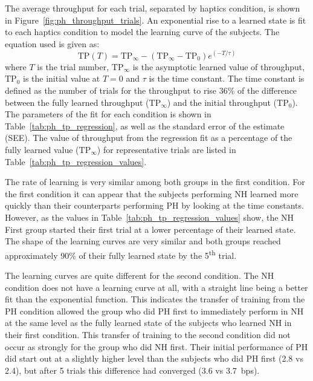 The average throughput for each trial, separated by haptics condition, is shown in Figure~\ref{fig:ph_throughput_trials}.
An exponential rise to a learned state is fit to each haptics condition to model the learning curve of the subjects.
The equation used is given as:
\begin{equation}
    \mathrm{TP}(T) = \mathrm{TP}_{\infty} - (\mathrm{TP}_{\infty}-\mathrm{TP}_0)e^{\left( -T / \tau \right)}
    \label{eq:ph_learning}
\end{equation}
where $T$ is the trial number, $\mathrm{TP}_{\infty}$ is the asymptotic learned value of throughput, $\mathrm{TP}_0$ is the initial value at $T=0$ and $\tau$ is the time constant.
The time constant is defined as the number of trials for the throughput to rise 36\% of the difference between the fully learned throughput ($\mathrm{TP}_{\infty}$) and the initial throughput ($\mathrm{TP}_0$).
The parameters of the fit for each condition is shown in Table~\ref{tab:ph_tp_regression}, as well as the standard error of the estimate (SEE).
The value of throughput from the regression fit as a percentage of the fully learned value ($\mathrm{TP}_{\infty}$) for representative trials are listed in Table~\ref{tab:ph_tp_regression_values}.

The rate of learning is very similar among both groups in the first condition.
For the first condition it can appear that the subjects performing NH learned more quickly than their counterparts performing PH by looking at the time constants.
However, as the values in Table~\ref{tab:ph_tp_regression_values} show, the NH First group started their first trial at a lower percentage of their learned state.
The shape of the learning curves are very similar and both groups reached approximately 90\% of their fully learned state by the 5\textsuperscript{th} trial.

The learning curves are quite different for the second condition.
The NH condition does not have a learning curve at all, with a straight line being a better fit than the exponential function.
This indicates the transfer of training from the PH condition allowed the group who did PH first to immediately perform in NH at the same level as the fully learned state of the subjects who learned NH in their first condition.
This transfer of training to the second condition did not occur as strongly for the group who did NH first.
Their initial performance of PH did start out at a slightly higher level than the subjects who did PH first (\SI{2.8}{\bps} vs \SI{2.4}{\bps}), but after 5 trials this difference had converged (\SI{3.6}{\bps} vs \SI{3.7}{bps}).

